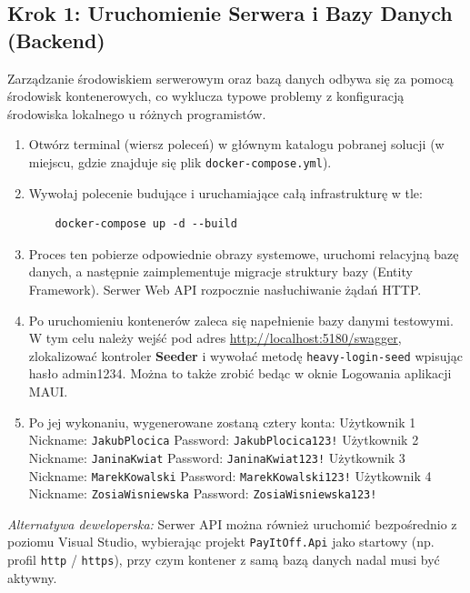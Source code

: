 \documentclass[12pt, a4paper]{article}
\begin{document}
\subsection{Krok 1: Uruchomienie Serwera i Bazy Danych (Backend)}
Zarządzanie środowiskiem serwerowym oraz bazą danych odbywa się za pomocą środowisk kontenerowych, co wyklucza typowe problemy z konfiguracją środowiska lokalnego u różnych programistów.
\begin{enumerate}
    \item Otwórz terminal (wiersz poleceń) w głównym katalogu pobranej solucji (w miejscu, gdzie znajduje się plik \texttt{docker-compose.yml}).
    \item Wywołaj polecenie budujące i uruchamiające całą infrastrukturę w tle:
    \begin{verbatim}
    docker-compose up -d --build
    \end{verbatim}
    \item Proces ten pobierze odpowiednie obrazy systemowe, uruchomi relacyjną bazę danych, a następnie zaimplementuje migracje struktury bazy (Entity Framework). Serwer Web API rozpocznie nasłuchiwanie żądań HTTP.
    \item Po uruchomieniu kontenerów zaleca się napełnienie bazy danymi testowymi. W tym celu należy wejść pod adres \url{http://localhost:5180/swagger}, zlokalizować kontroler \textbf{Seeder} i wywołać metodę \texttt{heavy-login-seed} wpisując hasło admin1234. Można to także zrobić bedąc w oknie Logowania aplikacji MAUI.
    \item Po jej wykonaniu, wygenerowane zostaną cztery konta: 
    \newline Użytkownik 1
    \newline Nickname: \texttt{JakubPlocica} 
    \newline Password: \texttt{JakubPlocica123!}
    \newline Użytkownik 2
    \newline Nickname: \texttt{JaninaKwiat} 
    \newline Password: \texttt{JaninaKwiat123!}
    \newline Użytkownik 3
    \newline Nickname: \texttt{MarekKowalski}
    \newline Password: \texttt{MarekKowalski123!}
    \newline Użytkownik 4
    \newline Nickname: \texttt{ZosiaWisniewska}
    \newline Password: \texttt{ZosiaWisniewska123!}
\end{enumerate}
\textit{Alternatywa deweloperska:} Serwer API można również uruchomić bezpośrednio z poziomu Visual Studio, wybierając projekt \texttt{PayItOff.Api} jako startowy (np. profil \texttt{http} / \texttt{https}), przy czym kontener z samą bazą danych nadal musi być aktywny.
\end{document}
